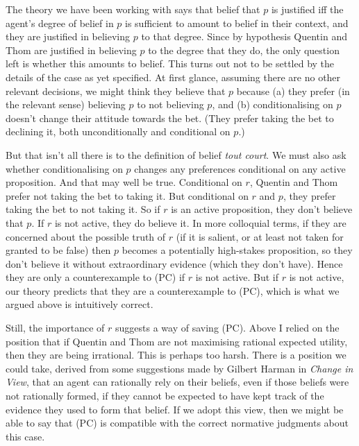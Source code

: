 The theory we have been working with says that belief that \(p\) is justified iff the agent's degree of belief in \(p\) is sufficient to amount to belief in their context, and they are justified in believing \(p\) to that degree. Since by hypothesis Quentin and Thom are justified in believing \(p\) to the degree that they do, the only question left is whether this amounts to belief. This turns out not to be settled by the details of the case as yet specified. At first glance, assuming there are no other relevant decisions, we might think they believe that \(p\) because (a) they prefer (in the relevant sense) believing \(p\) to not believing \(p\), and (b) conditionalising on \(p\) doesn't change their attitude towards the bet. (They prefer taking the bet to declining it, both unconditionally and conditional on \(p\).) 

But that isn't all there is to the definition of belief \textit{tout court}. We must also ask whether conditionalising on \(p\) changes any preferences conditional on any active proposition. And that may well be true. Conditional on \(r\), Quentin and Thom prefer not taking the bet to taking it. But conditional on \(r\) and \(p\), they prefer taking the bet to not taking it. So if \(r\) is an active proposition, they don't believe that \(p\). If \(r\) is not active, they do believe it. In more colloquial terms, if they are concerned about the possible truth of \(r\) (if it is salient, or at least not taken for granted to be false) then \(p\) becomes a potentially high-stakes proposition, so they don't believe it without extraordinary evidence (which they don't have). Hence they are only a counterexample to (PC) if \(r\) is not active. But if \(r\) is not active, our theory predicts that they are a counterexample to (PC), which is what we argued above is intuitively correct.

Still, the importance of \(r\) suggests a way of saving (PC). Above I relied on the position that if Quentin and Thom are not maximising rational expected utility, then they are being irrational. This is perhaps too harsh. There is a position we could take, derived from some suggestions made by Gilbert Harman in \textit{Change in View}, that an agent can rationally rely on their beliefs, even if those beliefs were not rationally formed, if they cannot be expected to have kept track of the evidence they used to form that belief. If we adopt this view, then we might be able to say that (PC) is compatible with the correct normative judgments about this case.


